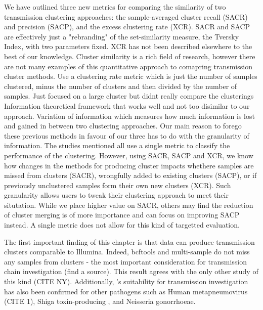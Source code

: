 We have outlined three new metrics for comparing the similarity of two transmission clustering approaches: the sample-averaged cluster recall (SACR) and precision (SACP), and the excess clustering rate (XCR). SACR and SACP are effectively just a "rebranding" of the set-similarity measure, the Tversky Index, with two parameters fixed. XCR has not been described elsewhere to the best of our knowledge. Cluster similarity is a rich field of research, however there are not many examples of this quantitative approach to comapring transmission cluster methods.
Use a clustering rate metric which is just the number of samples clustered, minus the number of clusters and then divided by the number of samples. 
Just focused on a large cluster but didnt really compare the clusterings
Information theoretical framework that works well and not too disimilar to our approach. Variation of information which measures how much information is lost and gained in between two clustering approaches.
Our main reason to forego these previous methods in favour of our three has to do with the granularity of information. The studies mentioned all use a single metric to classify the performance of the clustering. However, using SACR, SACP and XCR, we know how changes in the methods for producing cluster impacts whethere samples are missed from clusters (SACR), wrongfully added to existing clusters (SACP), or if previously unclustered samples form their own new clusters (XCR). Such granularity allows users to tweak their clustering approach to meet their situtation. While we place higher value on SACR, others may find the reduction of cluster merging is of more importance and can focus on improving SACP instead. A single metric does not allow for this kind of targetted evaluation.

The first important finding of this chapter is that \ont{} data can produce transmission clusters comparable to Illumina. Indeed, bcftools and \pandora{} multi-sample do not miss any samples from clusters - the most important consideration for transmission chain investigation (find a source). This result agrees with the only other \mtb{} study of this kind (CITE NY). Additionally, \ont{}'s suitability for transmission investigation has also been confirmed for other pathogens such as Human metapneumovirus (CITE 1), Shiga toxin-producing \ecoli{}, and  Neisseria gonorrhoeae.

